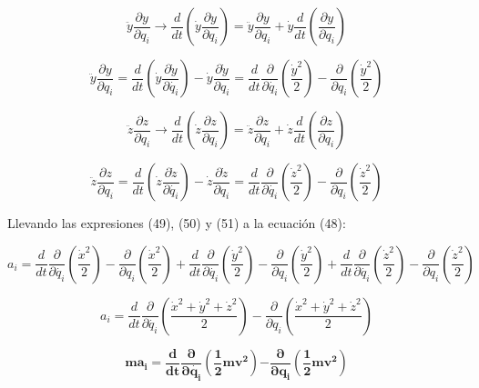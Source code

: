 \documentclass[]{article}
\begin{document}
\[\ddot{y}\frac{\partial y}{\partial q_{i}} \rightarrow \frac{d}{dt}\left( \dot{y}\frac{\partial y}{\partial q_{i}} \right) = \ddot{y}\frac{\partial y}{\partial q_{i}} + \dot{y}\frac{d}{dt}\left( \frac{\partial y}{\partial q_{i}} \right)\]

\[\ddot{y}\frac{\partial y}{\partial q_{i}} = \frac{d}{dt}\left( \dot{y}\frac{\partial\dot{y}}{\partial\dot{q_{i}}} \right) - \dot{y}\frac{\partial\dot{y}}{\partial q_{i}} = \frac{d}{dt}\frac{\partial}{\partial\dot{q_{i}}}\left( \frac{{\dot{y}}^{2}}{2} \right) - \frac{\partial}{\partial q_{i}}\left( \frac{{\dot{y}}^{2}}{2} \right)\]

\[\ddot{z}\frac{\partial z}{\partial q_{i}} \rightarrow \frac{d}{dt}\left( \dot{z}\frac{\partial z}{\partial q_{i}} \right) = \ddot{z}\frac{\partial z}{\partial q_{i}} + \dot{z}\frac{d}{dt}\left( \frac{\partial z}{\partial q_{i}} \right)\]

\[\ddot{z}\frac{\partial z}{\partial q_{i}} = \frac{d}{dt}\left( \dot{z}\frac{\partial\dot{z}}{\partial\dot{q_{i}}} \right) - \dot{z}\frac{\partial\dot{z}}{\partial q_{i}} = \frac{d}{dt}\frac{\partial}{\partial\dot{q_{i}}}\left( \frac{{\dot{z}}^{2}}{2} \right) - \frac{\partial}{\partial q_{i}}\left( \frac{{\dot{z}}^{2}}{2} \right)\]

Llevando las expresiones (49), (50) y (51) a la ecuación (48):

\[a_{i} = \frac{d}{dt}\frac{\partial}{\partial\dot{q_{i}}}\left( \frac{{\dot{x}}^{2}}{2} \right) - \frac{\partial}{\partial q_{i}}\left( \frac{{\dot{x}}^{2}}{2} \right) + \frac{d}{dt}\frac{\partial}{\partial\dot{q_{i}}}\left( \frac{{\dot{y}}^{2}}{2} \right) - \frac{\partial}{\partial q_{i}}\left( \frac{{\dot{y}}^{2}}{2} \right) + \frac{d}{dt}\frac{\partial}{\partial\dot{q_{i}}}\left( \frac{{\dot{z}}^{2}}{2} \right) - \frac{\partial}{\partial q_{i}}\left( \frac{{\dot{z}}^{2}}{2} \right)\]

\[a_{i} = \frac{d}{dt}\frac{\partial}{\partial\dot{q_{i}}}\left( \frac{{\dot{x}}^{2} + {\dot{y}}^{2} + {\dot{z}}^{2}}{2} \right) - \frac{\partial}{\partial q_{i}}\left( \frac{{\dot{x}}^{2} + {\dot{y}}^{2} + {\dot{z}}^{2}}{2} \right)\]

\[{\mathbf{m}\mathbf{a}}_{\mathbf{i}}\mathbf{=}\frac{\mathbf{d}}{\mathbf{dt}}\frac{\mathbf{\partial}}{\mathbf{\partial}\dot{\mathbf{q}_{\mathbf{i}}}}\left( \frac{\mathbf{1}}{\mathbf{2}}{\mathbf{m}\mathbf{v}}^{\mathbf{2}} \right)\mathbf{-}\frac{\mathbf{\partial}}{\mathbf{\partial}\mathbf{q}_{\mathbf{i}}}\left( \frac{\mathbf{1}}{\mathbf{2}}{\mathbf{m}\mathbf{v}}^{\mathbf{2}} \right)\]
\end{document}
